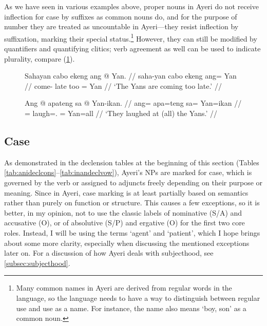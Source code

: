 %
As we have seen in various examples above, proper nouns in Ayeri do not receive
inflection for case by suffixes as common nouns do, and for the purpose of
number they are treated as uncountable in Ayeri---they resist inflection by
suffixation, marking their special status.\footnote{Many common names in Ayeri
are derived from regular words in the language, so the language needs to have a
way to distinguish between regular use and use as a name. For instance, the
name  also means `boy, son' as a common noun.} However, they can
still be modified by quantifiers and quantifying clitics; verb agreement as
well can be used to indicate plurality, compare (\ref{ex:verbplur}).

\begin{figure}[h]
\pex\label{ex:verbplur}
\a\begingl
	\gla Sahayan cabo ekeng ang @ Yan. //
	\glb saha-yan cabo ekeng ang= Yan //
	\glc come-\TplM{} late too \Aarg{}= Yan //
	\glft `The Yans are coming too late.' //
\endgl

\a\begingl
	\gla Ang @ apateng sa @ Yan-ikan. //
	\glb ang= apa=teng sa= Yan=ikan //
	\glc \AgtT{}= laugh=\TplF{}.\Aarg{} \Parg{}= Yan=all //
	\glft `They laughed at (all) the Yans.' //
\endgl
\xe
\end{figure}


\subsection{Case}
\label{subsec:case}

As demonstrated in the declension tables at the beginning of this section
(Tables \ref{tab:anideclcons}--\ref{tab:inandeclvow}), Ayeri's NPs are marked
for case, which is governed by the verb or assigned to adjuncts freely
depending on their purpose or meaning. Since in Ayeri, case marking is at least
partially based on semantics rather than purely on function or structure. This
causes a few exceptions, so it is better, in my opinion, not to use the classic
labels of nominative (S/A) and accusative (O), or of absolutive (S/P) and
ergative (O) for the first two core roles. Instead, I will be using the terms
`agent' and `patient', which I hope brings about some more clarity, especially
when discussing the mentioned exceptions later on. For a discussion of how
Ayeri deals with subjecthood, see \autoref{subsec:subjecthood}.

